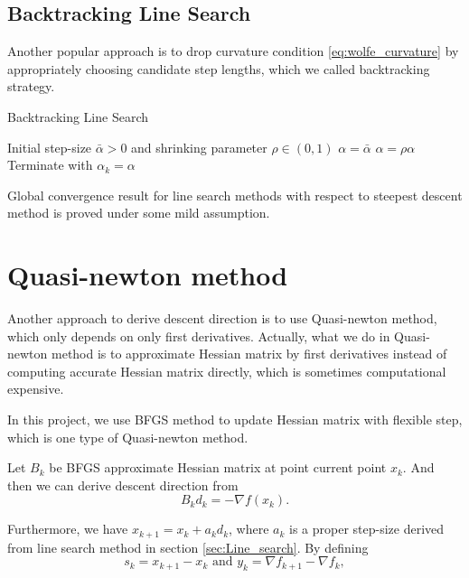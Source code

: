 \documentclass[11pt]{report}
\begin{document}

\subsection{Backtracking Line Search}
Another popular approach is to drop curvature condition \eqref{eq:wolfe_curvature} by appropriately choosing candidate step lengths, which we called backtracking strategy.
\begin{algorithm}[H]
\caption{Backtracking Line Search}
\label{alg:Backtracking Line Search}
\begin{algorithmic}[1]
\REQUIRE Initial step-size $\bar{\alpha} >0$ and shrinking parameter $\rho \in (0,1)$
\STATE $\alpha = \bar{\alpha}$
\REPEAT
    \STATE $\alpha = \rho \alpha$
\STATE Terminate with $\alpha_k = \alpha$
\end{algorithmic}
\end{algorithm}

Global convergence result for line search methods with respect to steepest descent method is proved under some mild assumption. 

\section{Quasi-newton method}\label{sec: Quasi-newton method}
Another approach to derive descent direction is to use Quasi-newton method, which only depends on only first derivatives. Actually, what we do in Quasi-newton method is to approximate Hessian matrix by first derivatives instead of computing accurate Hessian matrix directly, which is sometimes computational expensive.

In this project, we use BFGS method to update Hessian matrix with flexible step, which is one type of Quasi-newton method. 

Let $B_k$ be BFGS approximate Hessian matrix at point current point $x_k$. And then we can derive descent direction from
\begin{equation}\label{eq:BFGSupdate}
    B_kd_k = -\nabla f(x_k). 
\end{equation}

Furthermore, we have $x_{k+1} = x_k + a_kd_k$, where $a_k$ is a proper step-size derived from line search method in section \ref{sec:Line_search}. By defining
\begin{equation}
    s_k = x_{k+1} - x_k \mbox{~and~} y_k = \nabla f_{k+1} - \nabla f_k,
\end{equation}
\end{document}
